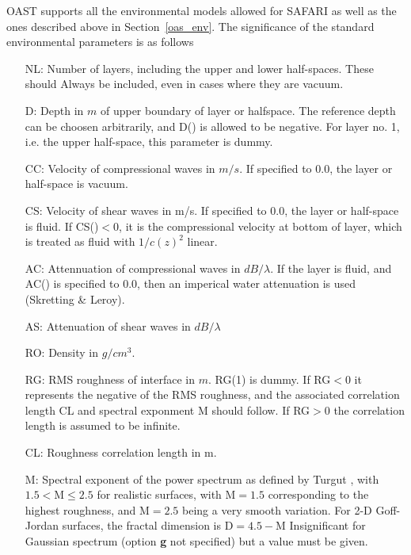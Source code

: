OAST supports all the environmental models allowed for SAFARI as well as the
ones described above in Section~\ref{oas_env}.  The significance of
the standard environmental parameters is as follows
\begin{itemize}	
		\item[NL:]	Number of layers, including the upper and lower
		half-spaces. These should Always be included,
		even in cases where they are vacuum.

		\item[D:]	Depth in $m$ of upper boundary of layer or
		halfspace. The reference depth can be choosen
		arbitrarily, and D() is allowed to be negative.
		For layer no. 1, i.e. the upper half-space, this
     		parameter is dummy.

		\item[CC:]	Velocity of compressional waves in $m/s$.
        	If specified to 0.0, the layer or half-space is
		vacuum.

		\item[CS:]	Velocity of shear waves in m/s.
 		If specified to 0.0, the layer or half-space is fluid.
                If CS()$< 0$, it is the compressional velocity at bottom of
		layer, which is treated as fluid with $1/c(z)^{2}$ linear.

		\item[AC:]   Attennuation of compressional waves in 
		$dB/\lambda$. If the layer is fluid, and AC() is specified to
		0.0, then an imperical water attenuation is
		used (Skretting \& Leroy).

		\item[AS:]   Attenuation of shear waves in $dB/\lambda$

		\item[RO:]   Density in $g/cm^{3}$.

		\item[RG:] RMS roughness of interface in $m$. RG(1) is
		dummy. If RG$<0$ it represents the negative of the RMS
		roughness, and the associated correlation length CL
		and spectral exponment M should follow. If RG$>0$ the 
                correlation length is
		assumed to be infinite.  
                \item[CL:] Roughness
		correlation length in m.  

                \item[M:] Spectral exponent of the power spectrum as
                defined by Turgut \cite{Turgut_97}, with $1.5 <
                \mbox{M} \le 2.5 $ for realistic surfaces, with
                $\mbox{M} =1.5 $ corresponding to the highest
                roughness, and $\mbox{M}=2.5$ being a very smooth
                variation. For 2-D Goff-Jordan surfaces, the fractal
                dimension is $ \mbox{D} = 4.5 - \mbox{M} $
                Insignificant
                for Gaussian spectrum (option {\bf g} not specified)
                but a  value must
                be given.
                \end{itemize}


